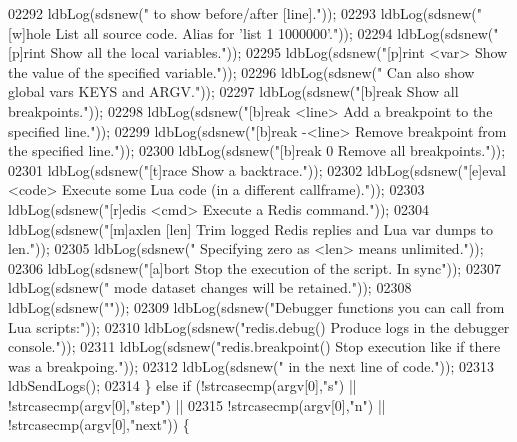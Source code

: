 \begin{DoxyCode}
{{{{{{{{{{{{{{{{{{{{{{{{02292 ldbLog(sdsnew(\textcolor{stringliteral}{"                     to show before/after [line]."}));
02293 ldbLog(sdsnew(\textcolor{stringliteral}{"[w]hole              List all source code. Alias for 'list 1 1000000'."}));
02294 ldbLog(sdsnew(\textcolor{stringliteral}{"[p]rint              Show all the local variables."}));
02295 ldbLog(sdsnew(\textcolor{stringliteral}{"[p]rint <var>        Show the value of the specified variable."}));
02296 ldbLog(sdsnew(\textcolor{stringliteral}{"                     Can also show global vars KEYS and ARGV."}));
02297 ldbLog(sdsnew(\textcolor{stringliteral}{"[b]reak              Show all breakpoints."}));
02298 ldbLog(sdsnew(\textcolor{stringliteral}{"[b]reak <line>       Add a breakpoint to the specified line."}));
02299 ldbLog(sdsnew(\textcolor{stringliteral}{"[b]reak -<line>      Remove breakpoint from the specified line."}));
02300 ldbLog(sdsnew(\textcolor{stringliteral}{"[b]reak 0            Remove all breakpoints."}));
02301 ldbLog(sdsnew(\textcolor{stringliteral}{"[t]race              Show a backtrace."}));
02302 ldbLog(sdsnew(\textcolor{stringliteral}{"[e]eval <code>       Execute some Lua code (in a different callframe)."}));
02303 ldbLog(sdsnew(\textcolor{stringliteral}{"[r]edis <cmd>        Execute a Redis command."}));
02304 ldbLog(sdsnew(\textcolor{stringliteral}{"[m]axlen [len]       Trim logged Redis replies and Lua var dumps to len."}));
02305 ldbLog(sdsnew(\textcolor{stringliteral}{"                     Specifying zero as <len> means unlimited."}));
02306 ldbLog(sdsnew(\textcolor{stringliteral}{"[a]bort              Stop the execution of the script. In sync"}));
02307 ldbLog(sdsnew(\textcolor{stringliteral}{"                     mode dataset changes will be retained."}));
02308 ldbLog(sdsnew(\textcolor{stringliteral}{""}));
02309 ldbLog(sdsnew(\textcolor{stringliteral}{"Debugger functions you can call from Lua scripts:"}));
02310 ldbLog(sdsnew(\textcolor{stringliteral}{"redis.debug()        Produce logs in the debugger console."}));
02311 ldbLog(sdsnew(\textcolor{stringliteral}{"redis.breakpoint()   Stop execution like if there was a breakpoing."}));
02312 ldbLog(sdsnew(\textcolor{stringliteral}{"                     in the next line of code."}));
02313             ldbSendLogs();
02314         \} \textcolor{keywordflow}{else} \textcolor{keywordflow}{if} (!strcasecmp(argv[0],\textcolor{stringliteral}{"s"}) || !strcasecmp(argv[0],\textcolor{stringliteral}{"step"}) ||
02315                    !strcasecmp(argv[0],\textcolor{stringliteral}{"n"}) || !strcasecmp(argv[0],\textcolor{stringliteral}{"next"})) \{
}}}}}}}}}}}}}}}}}}}}}}}}
\end{DoxyCode}
